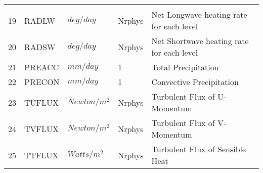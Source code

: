 \begin{tabular}{lllll}
\begin{minipage}[t]{3in}
         \end{minipage}\\
19 & RADLW    &  $deg/day$ &  Nrphys 
         &\begin{minipage}[t]{3in}
          {Net Longwave heating rate for each level}
         \end{minipage}\\
20 & RADSW    &  $deg/day$ &  Nrphys 
         &\begin{minipage}[t]{3in}
          {Net Shortwave heating rate for each level}
         \end{minipage}\\
21 & PREACC   &  $mm/day$ &  1
         &\begin{minipage}[t]{3in}
          {Total Precipitation}
         \end{minipage}\\
22 & PRECON   &  $mm/day$ &  1
         &\begin{minipage}[t]{3in}
          {Convective Precipitation}
         \end{minipage}\\
23 & TUFLUX   &  $Newton/m^2$ &  Nrphys
         &\begin{minipage}[t]{3in}
          {Turbulent Flux of U-Momentum}
         \end{minipage}\\
24 & TVFLUX   &  $Newton/m^2$ &  Nrphys
         &\begin{minipage}[t]{3in}
          {Turbulent Flux of V-Momentum}
         \end{minipage}\\
25 & TTFLUX   &  $Watts/m^2$ &  Nrphys
         &\begin{minipage}[t]{3in}
          {Turbulent Flux of Sensible Heat}
         \end{minipage}\\
\end{tabular}


